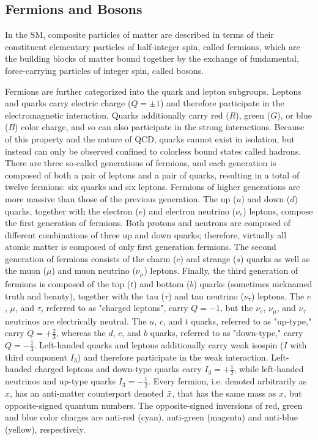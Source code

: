 \subsection{Fermions and Bosons}
In the SM, composite particles of matter are described in terms of their constituent elementary particles of half-integer spin, called fermions, which are the building blocks of matter bound together by the exchange of fundamental, force-carrying particles of integer spin, called bosons. 

Fermions are further categorized into the quark and lepton subgroups.
Leptons and quarks carry electric charge ($Q = \pm 1$) and therefore participate in the electromagnetic interaction.
Quarks additionally carry red ($R$), green ($G$), or blue ($B$) color charge, and so can also participate in the strong interactions.
Because of this property and the nature of QCD, quarks cannot exist in isolation, but instead can only be observed confined to colorless bound states called hadrons.
There are three so-called generations of fermions, and each generation is composed of both a pair of leptons and a pair of quarks, resulting in a total of twelve fermions: six quarks and six leptons.
Fermions of higher generations are more massive than those of the previous generation.
The up ($u$) and down ($d$) quarks, together with the electron ($e$) and electron neutrino ($\nu_e$) leptons, compose the first generation of fermions.
Both protons and neutrons are composed of different combinations of three up and down quarks; therefore, virtually all atomic matter is composed of only first generation fermions.
The second generation of fermions consists of the charm ($c$) and strange ($s$) quarks as well as the muon ($\mu$) and muon neutrino ($\nu_\mu$) leptons.
Finally, the third generation of fermions is composed of the top ($t$) and bottom ($b$) quarks (sometimes nicknamed truth and beauty), together with the tau ($\tau$) and tau neutrino ($\nu_\tau$) leptons.
The $e$, $\mu$, and $\tau$, referred to as "charged leptons", carry $Q = -1$, but the $\nu_e$, $\nu_\mu$, and $\nu_\tau$ neutrinos are electrically neutral.
The $u$, $c$, and $t$ quarks, referred to as "up-type," carry $Q = +\frac{2}{3}$, whereas the $d$, $c$, and $b$ quarks, referred to as "down-type," carry $Q = -\frac{1}{3}$.
Left-handed quarks and leptons additionally carry weak isospin ($I$ with third component $I_3$) and therefore participate in the weak interaction.
Left-handed charged leptons and down-type quarks carry $I_3 = +\frac{1}{2}$, while left-handed neutrinos and up-type quarks $I_3 = -\frac{1}{2}$.
Every fermion, i.e. denoted arbitrarily as $x$, has an anti-matter counterpart denoted $\Bar{x}$, that has the same mass as $x$, but opposite-signed quantum numbers.
The opposite-signed inversions of red, green and blue color charges are anti-red (cyan), anti-green (magenta) and anti-blue (yellow), respectively.

